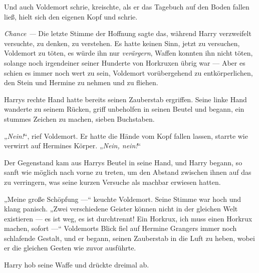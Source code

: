 Und auch Voldemort schrie, kreischte, als er das Tagebuch auf den Boden fallen ließ, hielt sich den eigenen Kopf und schrie.

\emph{Chance —}
%
Die letzte Stimme der Hoffnung sagte das, während Harry verzweifelt versuchte, zu denken, zu verstehen. Es hatte keinen Sinn, jetzt zu versuchen, Voldemort zu töten, es würde ihn nur \emph{verärgern}, Waffen konnten ihn nicht töten, solange noch irgendeiner seiner Hunderte von Horkruxen übrig war —
Aber es schien es immer noch wert zu sein, Voldemort vorübergehend zu entkörperlichen, den Stein und Hermine zu nehmen und zu fliehen.

Harrys rechte Hand hatte bereits seinen Zauberstab ergriffen. Seine linke Hand wanderte zu seinem Rücken, griff unbeholfen in seinen Beutel und begann, ein stummes Zeichen zu machen, sieben Buchstaben.

„\emph{Nein!}“, rief Voldemort. Er hatte die Hände vom Kopf fallen lassen, starrte wie verwirrt auf Hermines Körper.
„\emph{Nein, nein!}“

Der Gegenstand kam aus Harrys Beutel in seine Hand, und Harry begann, so sanft wie möglich nach vorne zu treten, um den Abstand zwischen ihnen auf das zu verringern, was seine kurzen Versuche als machbar erwiesen hatten.

„Meine große Schöpfung —“ keuchte Voldemort. Seine Stimme war hoch und klang panisch.
„Zwei verschiedene Geister können nicht in der gleichen Welt existieren — es ist weg, es ist durchtrennt! Ein Horkrux, ich muss einen Horkrux machen, sofort —“
Voldemorts Blick fiel auf Hermine Grangers immer noch schlafende Gestalt, und er begann, seinen Zauberstab in die Luft zu heben, wobei er die gleichen Gesten wie zuvor ausführte.

Harry hob seine Waffe und drückte dreimal ab.

